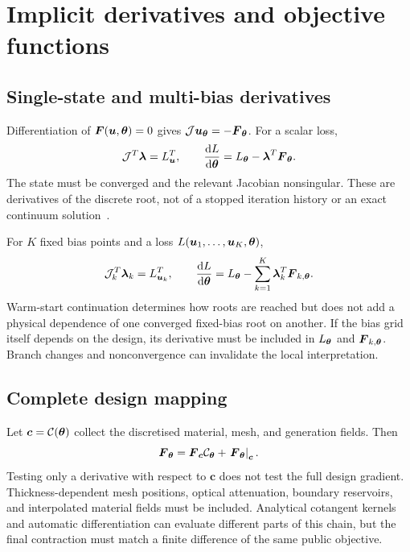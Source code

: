 \documentclass[11pt,a4paper]{article}
\numberwithin{equation}{section}
\begin{document}
\section{Implicit derivatives and objective functions}\label{supp:adjoint}
\subsection{Single-state and multi-bias derivatives}
Differentiation of $\boldsymbol{F}(\boldsymbol{u},\boldsymbol{\theta})=0$ gives
$\mathcal{J}\boldsymbol{u}_{\boldsymbol{\theta}}=-\boldsymbol{F}_{\boldsymbol{\theta}}$. For a scalar loss,
\begin{equation}
\mathcal{J}^T\boldsymbol\lambda=L_{\boldsymbol{u}}^T,\qquad
\frac{\mathrm{d} L}{\mathrm{d}\boldsymbol{\theta}}=L_{\boldsymbol{\theta}}-\boldsymbol\lambda^T\boldsymbol{F}_{\boldsymbol{\theta}}.
\end{equation}
The state must be converged and the relevant Jacobian nonsingular.
These are derivatives of the discrete root, not of a stopped iteration
history or an exact continuum solution~\cite{mann2022partial,blondel2022}.

For $K$ fixed bias points and a loss
$L(\boldsymbol{u}_1,\ldots,\boldsymbol{u}_K,\boldsymbol{\theta})$,
\begin{equation}
\mathcal{J}_k^T\boldsymbol\lambda_k=L_{\boldsymbol{u}_k}^T,\qquad
\frac{\mathrm{d} L}{\mathrm{d}\boldsymbol{\theta}}=L_{\boldsymbol{\theta}}
-\sum_{k=1}^{K}\boldsymbol\lambda_k^T\boldsymbol{F}_{k,\boldsymbol{\theta}}.
\label{supp:multibias}
\end{equation}
Warm-start continuation determines how roots are reached but does not add
a physical dependence of one converged fixed-bias root on another.
If the bias grid itself depends on the design, its derivative must be
included in $L_{\boldsymbol{\theta}}$ and $\boldsymbol{F}_{k,\boldsymbol{\theta}}$. Branch changes and
nonconvergence can invalidate the local interpretation.

\subsection{Complete design mapping}
Let $\boldsymbol c=\mathcal C(\boldsymbol{\theta})$ collect the discretised material,
mesh, and generation fields. Then
\begin{equation}
\boldsymbol{F}_{\boldsymbol{\theta}}=\boldsymbol{F}_{\boldsymbol c}\mathcal C_{\boldsymbol{\theta}}
+\left.\boldsymbol{F}_{\boldsymbol{\theta}}\right|_{\boldsymbol c}.
\end{equation}
Testing only a derivative with respect to $\boldsymbol c$ does not test
the full design gradient. Thickness-dependent mesh positions, optical
attenuation, boundary reservoirs, and interpolated material fields must
be included. Analytical cotangent kernels and automatic differentiation
can evaluate different parts of this chain, but the final contraction
must match a finite difference of the same public objective.
\end{document}
